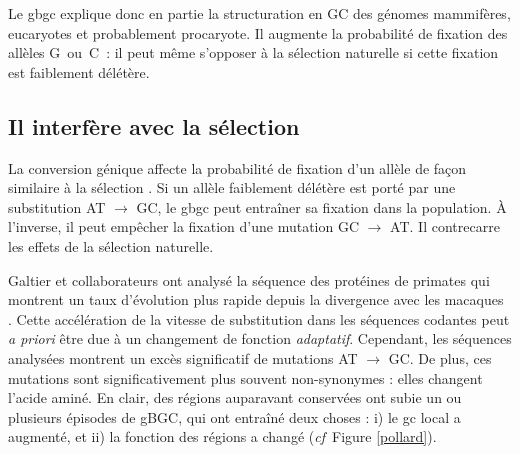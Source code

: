 \documentclass[11pt, oneside]{scrartcl}
\begin{document}
\begin{transition}
  Le \ac{gbgc} explique donc en partie la structuration en GC des génomes
  mammifères, eucaryotes et probablement procaryote. Il augmente la probabilité
  de fixation des allèles G ou C : il peut même s'opposer à la sélection
  naturelle si cette fixation est faiblement délétère.  
\end{transition}


\subsection{Il interfère avec la sélection}
\label{sec:orgheadline15}
La conversion génique affecte la probabilité de fixation d'un allèle de façon
similaire à la sélection \cite{nagylaki_evolution_1983}. Si un allèle faiblement
délétère est porté par une substitution AT \(\rightarrow\) GC, le \ac{gbgc} peut
entraîner sa fixation dans la population. À l'inverse, il peut empêcher la
fixation d'une mutation GC \(\rightarrow\) AT. Il contrecarre les effets de la
sélection naturelle.

Galtier et collaborateurs ont analysé la séquence des protéines de primates qui
montrent un taux d'évolution plus rapide depuis la divergence avec les macaques
\cite{galtier_gc-biased_2009}. Cette accélération de la vitesse de substitution
dans les séquences codantes peut \emph{a priori} être due à un changement de fonction
\emph{adaptatif}. Cependant, les séquences analysées montrent un excès significatif
de mutations AT \(\rightarrow\) GC. De plus, ces mutations sont significativement
plus souvent non-synonymes : elles changent l'acide aminé. En clair, des régions
auparavant conservées ont subie un ou plusieurs épisodes de gBGC, qui ont
entraîné deux choses : i) le \ac{gc} local a augmenté, et ii) la fonction des
régions a changé (\emph{cf} Figure \ref{pollard}).
\end{document}
